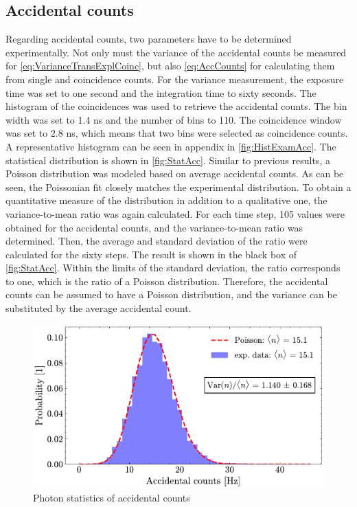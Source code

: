 \subsection{Accidental counts}
Regarding accidental counts, two parameters have to be determined experimentally.
Not only must the variance of the accidental counts be measured for \autoref{eq:VarianceTransExplCoinc}, but also \autoref{eq:AccCounts} for calculating them from single and coincidence counts. \newline
For the variance measurement, the exposure time was set to one second and the integration time to sixty seconds.
The histogram of the coincidences was used to retrieve the accidental counts. The bin width was set to 1.4 ns and the number of bins to 110. The coincidence window was set to 2.8 ns, which means that two bins were selected as coincidence counts. A representative histogram can be seen in appendix in \autoref{fig:HistExamAcc}.
\newline
The statistical distribution is shown in \autoref{fig:StatAcc}. Similar to previous results, a Poisson distribution was modeled based on average accidental counts. As can be seen, the Poissonian fit closely matches the experimental distribution. \newline
To obtain a quantitative measure of the distribution in addition to a qualitative one, the variance-to-mean ratio was again calculated. For each time step, 105 values were obtained for the accidental counts, and the variance-to-mean ratio was determined. Then, the average and standard deviation of the ratio were calculated for the sixty steps. The result is shown in the black box of \autoref{fig:StatAcc}. \newline
Within the limits of the standard deviation, the ratio corresponds to one, which is the ratio of a Poisson distribution. Therefore, the accidental counts can be assumed to have a Poisson distribution, and the variance can be substituted by the average accidental count.
\begin{figure}[tb!]
	\centering
	\includegraphics[width=.9\textwidth]{Images/AccCountsStatistics_2.pdf}
	\caption{Photon statistics of accidental counts}
	\label{fig:StatAcc}
\end{figure} \newline
